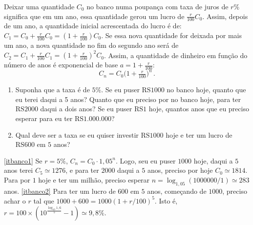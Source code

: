 \begin{exo}\label{Exo:Banco}
Deixar uma quantidade $C_0$ no banco numa poupança com taxa de
juros de $r\%$
significa que em um ano, 
essa quantidade gerou um lucro de $\frac{r}{100}C_0$. Assim, depois de 
um ano, a quantidade inicial acrescentada do lucro é de:
$C_1=C_0+\frac{r}{100}C_0=(1+\frac{r}{100})C_0$. Se essa nova quantidade for
deixada por mais um ano, a nova quantidade no fim do segundo ano será de
$C_2=C_1+\frac{r}{100}C_1=(1+\frac{r}{100})^2C_0$. Assim, a quantidade de
dinheiro em função do número de anos é exponencial de base $a=1+\frac{r}{100}$: 
$$C_n=C_0\big(1+\tfrac{r}{100}\big)^n\,.$$
\begin{enumerate}
 \item\label{itbanco1} Suponha que a taxa é de $5\%$.
Se eu puser $\mathrm{RS}1000$ no banco hoje, quanto que eu terei daqui a 5 anos?
Quanto que eu preciso por no banco hoje, para ter $\mathrm{RS}2000$ daqui a dois
anos?
Se eu puser $\mathrm{RS}1$ hoje, quantos anos que eu preciso esperar para eu ter
$\mathrm{RS}1.000.000$?
\item\label{itbanco2} Qual deve ser a taxa se eu quiser investir
$\mathrm{RS}1000$ hoje e ter um lucro de $\mathrm{RS}600$ em $5$ anos?
\end{enumerate}
\begin{sol}
\eqref{itbanco1} Se $r=5\%$, $C_n=C_0\cdot 1,05^n$. 
Logo, seu eu puser $1000$ hoje, daqui a $5$ anos terei 
$C_5\simeq 1276$, e 
para ter $2000$ daqui a $5$ anos, preciso por hoje $C_0\simeq 1814$.
Para por $1$ hoje e ter um milhão, preciso esperar
$n=\log_{1,05}(1000000/1)\simeq 283$ anos.
\eqref{itbanco2} Para ter um lucro de $600$ em $5$ anos, começando de $1000$,
preciso achar o $r$ tal que 
$1000+600=1000(1+r/100)^5$. Isto é, $r=100\times
(10^{\frac{\log_{10}1,6}{5}}-1)\simeq 9,8\%$.
\end{sol}
\end{exo}

